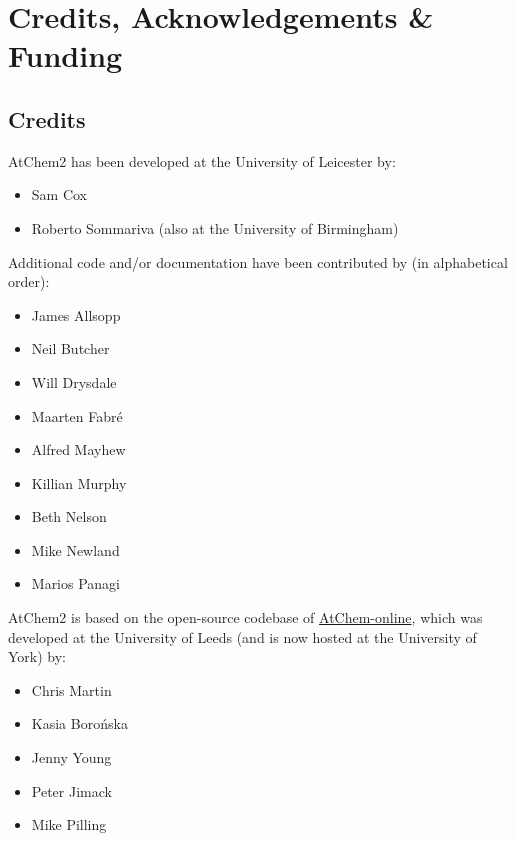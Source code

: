 %
%
%
%

\chapter{Credits, Acknowledgements \& Funding} \label{ch:credits}

\setlength{\parindent}{0pt}

\section{Credits} \label{sec:credits}

AtChem2 has been developed at the University of Leicester by:

\begin{itemize}
\item Sam Cox
\item Roberto Sommariva (also at the University of Birmingham)
\end{itemize}

Additional code and/or documentation have been contributed by (in alphabetical order):

\begin{itemize}
\item James Allsopp
\item Neil Butcher
\item Will Drysdale
\item Maarten Fabr{\'e}
\item Alfred Mayhew
\item Killian Murphy
\item Beth Nelson
\item Mike Newland
\item Marios Panagi
\end{itemize}

AtChem2 is based on the open-source codebase of \href{https://atchem.york.ac.uk}{AtChem-online},
which was developed at the University of Leeds (and is now hosted at the University of York) by:

\begin{itemize}
\item Chris Martin
\item Kasia Boro{\'n}ska
\item Jenny Young
\item Peter Jimack
\item Mike Pilling
\end{itemize}


